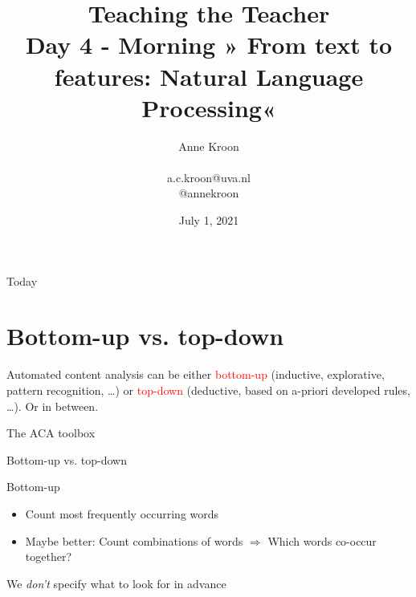 \documentclass[handout]{beamer}
\title[Big Data and Automated Content Analysis]{\textbf{Teaching the Teacher} \\ Day 4 - Morning » From text to features: Natural Language Processing«}
\author[Anne Kroon]{Anne Kroon \\ ~ \\ \footnotesize{a.c.kroon@uva.nl \\@annekroon} \\ }
\date{July 1, 2021}
\institute[UvA]{Afdeling Communicatiewetenschap \\Universiteit van Amsterdam}
\begin{document}
	
	\begin{frame}{}
		\titlepage
	\end{frame}
	
	\begin{frame}{Today}
		\tableofcontents
	\end{frame}

\section{Bottom-up vs. top-down}

\begin{frame}[standout]
Automated content analysis can be either \textcolor{red}{bottom-up} (inductive, explorative, pattern recognition, \ldots) or \textcolor{red}{top-down} (deductive, based on a-priori developed rules, \ldots). Or in between.
\end{frame}


\begin{frame}{The ACA toolbox}
\\
\cite{Boumans2016}
\end{frame}


\begin{frame}{Bottom-up vs. top-down}
\begin{block}{Bottom-up}
\begin{itemize}
\item Count most frequently occurring words 
\item Maybe better: Count combinations of words $\Rightarrow$ Which words co-occur together?
\end{itemize}
We \emph{don't} specify what to look for in advance	
\end{block}

\end{frame}
\end{document}
